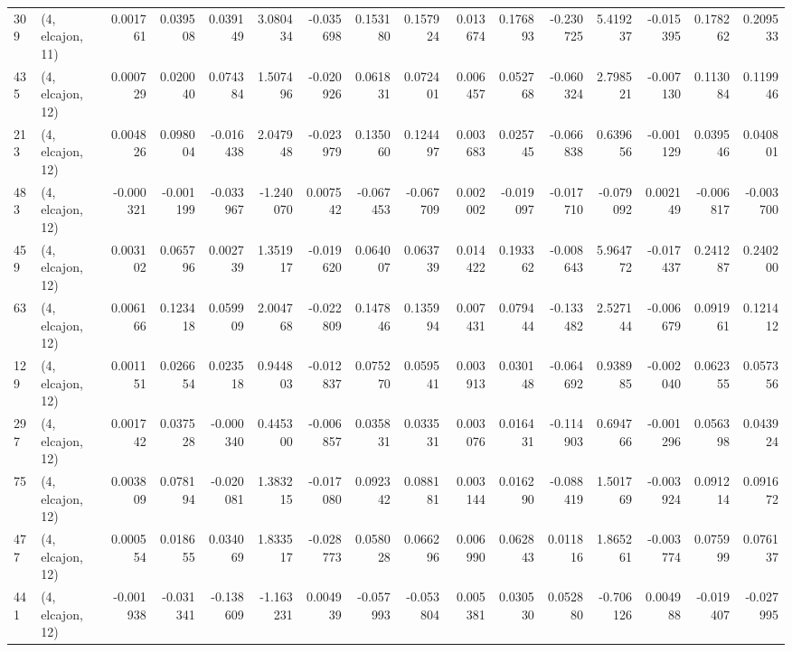 \begin{tabular}{llrrrrrrrrrrrrrr}
309 &  (4, elcajon, 11) &   0.001761 &  0.039508 &  0.039149 &    3.080434 & -0.035698 &   0.153180 &  0.157924 &  0.013674 &  0.176893 & -0.230725 &     5.419237 & -0.015395 &  0.178262 &  0.209533 \\
435 &  (4, elcajon, 12) &   0.000729 &  0.020040 &  0.074384 &    1.507496 & -0.020926 &   0.061831 &  0.072401 &  0.006457 &  0.052768 & -0.060324 &     2.798521 & -0.007130 &  0.113084 &  0.119946 \\
213 &  (4, elcajon, 12) &   0.004826 &  0.098004 & -0.016438 &    2.047948 & -0.023979 &   0.135060 &  0.124497 &  0.003683 &  0.025745 & -0.066838 &     0.639656 & -0.001129 &  0.039546 &  0.040801 \\
483 &  (4, elcajon, 12) &  -0.000321 & -0.001199 & -0.033967 &   -1.240070 &  0.007542 &  -0.067453 & -0.067709 &  0.002002 & -0.019097 & -0.017710 &    -0.079092 &  0.002149 & -0.006817 & -0.003700 \\
459 &  (4, elcajon, 12) &   0.003102 &  0.065796 &  0.002739 &    1.351917 & -0.019620 &   0.064007 &  0.063739 &  0.014422 &  0.193362 & -0.008643 &     5.964772 & -0.017437 &  0.241287 &  0.240200 \\
63  &  (4, elcajon, 12) &   0.006166 &  0.123418 &  0.059909 &    2.004768 & -0.022809 &   0.147846 &  0.135994 &  0.007431 &  0.079444 & -0.133482 &     2.527144 & -0.006679 &  0.091961 &  0.121412 \\
129 &  (4, elcajon, 12) &   0.001151 &  0.026654 &  0.023518 &    0.944803 & -0.012837 &   0.075270 &  0.059541 &  0.003913 &  0.030148 & -0.064692 &     0.938985 & -0.002040 &  0.062355 &  0.057356 \\
297 &  (4, elcajon, 12) &   0.001742 &  0.037528 & -0.000340 &    0.445300 & -0.006857 &   0.035831 &  0.033531 &  0.003076 &  0.016431 & -0.114903 &     0.694766 & -0.001296 &  0.056398 &  0.043924 \\
75  &  (4, elcajon, 12) &   0.003809 &  0.078194 & -0.020081 &    1.383215 & -0.017080 &   0.092342 &  0.088181 &  0.003144 &  0.016290 & -0.088419 &     1.501769 & -0.003924 &  0.091214 &  0.091672 \\
477 &  (4, elcajon, 12) &   0.000554 &  0.018655 &  0.034069 &    1.833517 & -0.028773 &   0.058028 &  0.066296 &  0.006990 &  0.062843 &  0.011816 &     1.865261 & -0.003774 &  0.075999 &  0.076137 \\
441 &  (4, elcajon, 12) &  -0.001938 & -0.031341 & -0.138609 &   -1.163231 &  0.004939 &  -0.057993 & -0.053804 &  0.005381 &  0.030530 &  0.052880 &    -0.706126 &  0.004988 & -0.019407 & -0.027995 \\

\end{tabular}
